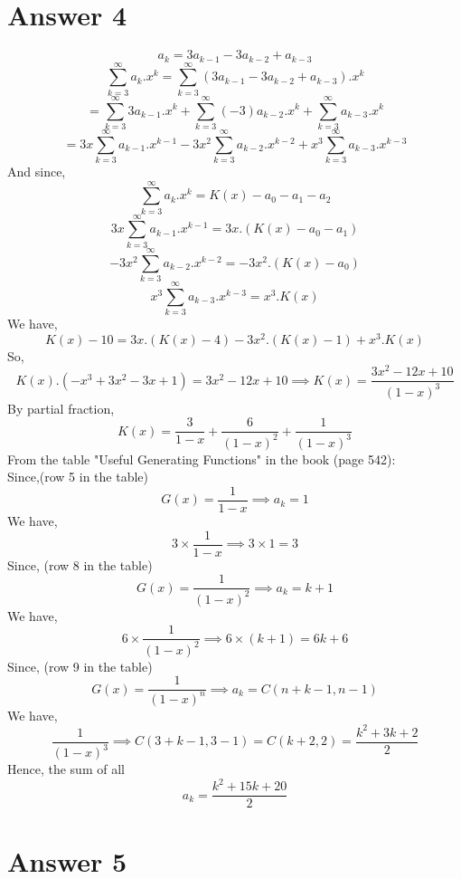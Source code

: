 \documentclass[11pt]{article}
\begin{document}
\section*{Answer 4}
$$
a_k = 3a_{k-1}-3a_{k-2}+a_{k-3}
$$
$$
\sum_{k=3}^{\infty} a_k.x^k = \sum_{k=3}^{\infty} (3a_{k-1}-3a_{k-2}+a_{k-3}).x^k
$$
$$
= \sum_{k=3}^{\infty} 3a_{k-1}.x^k + \sum_{k=3}^{\infty} (-3)a_{k-2}.x^k +\sum_{k=3}^{\infty} a_{k-3}.x^k
$$
$$
= 3x \sum_{k=3}^{\infty} a_{k-1}.x^{k-1} -3x^2\sum_{k=3}^{\infty} a_{k-2}.x^{k-2} + x^3 \sum_{k=3}^{\infty} a_{k-3}.x^{k-3}
$$
And since,
$$
\sum_{k=3}^{\infty} a_k.x^k = K(x) - a_0 - a_1 - a_2
$$
$$
3x \sum_{k=3}^{\infty} a_{k-1}.x^{k-1} = 3x.(K(x) - a_0 - a_1)
$$
$$
-3x^2 \sum_{k=3}^{\infty} a_{k-2}.x^{k-2} = -3x^2.(K(x) - a_0)
$$
$$
x^3 \sum_{k=3}^{\infty} a_{k-3}.x^{k-3} = x^3.K(x)
$$
We have,
$$
K(x)-10 = 3x.(K(x) - 4) -3x^2.(K(x) - 1) + x^3.K(x)
$$
So,
$$
K(x).(-x^3+3x^2-3x+1) = 3x^2-12x+10 \implies K(x) = \frac{3x^2-12x+10}{(1-x)^3}
$$
By partial fraction,
$$
K(x) = \frac{3}{1-x}+\frac{6}{(1-x)^2} + \frac{1}{(1-x)^3}
$$
From the table "Useful Generating Functions" in the book (page 542):\\
Since,(row 5 in the table)
$$
G(x) = \frac{1}{1-x} \implies a_k = 1
$$
We have,
$$
3\times \frac{1}{1-x} \implies 3\times1 = 3
$$
Since, (row 8 in the table)
$$
G(x) = \frac{1}{(1-x)^2} \implies a_k = k + 1
$$
We have,
$$
6\times \frac{1}{(1-x)^2} \implies 6\times(k+1) = 6k+6
$$
Since, (row 9 in the table)
$$
G(x) = \frac{1}{(1-x)^n} \implies a_k = C(n+k-1,n-1)
$$
We have,
$$
\frac{1}{(1-x)^3} \implies C(3+k-1,3-1) = C(k+2,2) = \frac{k^2+3k+2}{2}
$$
Hence, the sum of all
$$
a_k = \frac{k^2+15k+20}{2}
$$


\section*{Answer 5}
\end{document}
